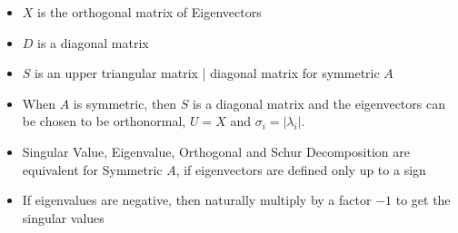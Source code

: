 \begin{itemize}
\item $X$ is the orthogonal matrix of Eigenvectors
\item $D$ is a diagonal matrix
\item $S$ is an upper triangular matrix | diagonal matrix for symmetric $A$
\item When $A$ is symmetric, then $S$ is a diagonal matrix and the eigenvectors can be chosen to be orthonormal, $U=X$ and $\sigma_i=\left|\lambda_i\right|$.
\item Singular Value, Eigenvalue, Orthogonal and Schur Decomposition are equivalent for Symmetric $A$, if eigenvectors are defined only up to a sign
\item If eigenvalues are negative, then naturally multiply by a factor  $-1$ to get the singular values
\end{itemize}